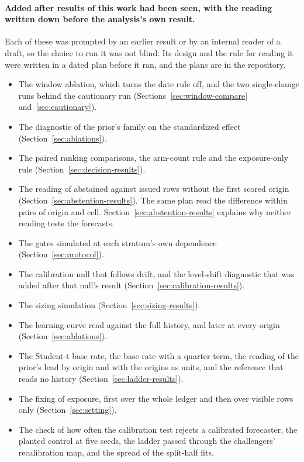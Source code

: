 \paragraph{Added after results of this work had been seen, with the reading written down before the analysis's own result.}
Each of these was prompted by an earlier result or by an internal reader of a draft, so the choice to run it was not blind. Its design and the rule for reading it were written in a dated plan before it ran, and the plans are in the repository.
\begin{itemize}
\item The window ablation, which turns the date rule off, and the two single-change runs behind the cautionary run (Sections~\ref{sec:window-compare} and~\ref{sec:cautionary}).
\item The diagnostic of the prior's family on the standardized effect (Section~\ref{sec:ablations}).
\item The paired ranking comparisons, the arm-count rule and the exposure-only rule (Section~\ref{sec:decision-results}).
\item The reading of abstained against issued rows without the first scored origin (Section~\ref{sec:abstention-results}). The same plan read the difference within pairs of origin and cell. Section~\ref{sec:abstention-results} explains why neither reading tests the forecasts.
\item The gates simulated at each stratum's own dependence (Section~\ref{sec:protocol}).
\item The calibration null that follows drift, and the level-shift diagnostic that was added after that null's result (Section~\ref{sec:calibration-results}).
\item The sizing simulation (Section~\ref{sec:sizing-results}).
\item The learning curve read against the full history, and later at every origin (Section~\ref{sec:ablations}).
\item The Student-t base rate, the base rate with a quarter term, the reading of the prior's lead by origin and with the origins as units, and the reference that reads no history (Section~\ref{sec:ladder-results}).
\item The fixing of exposure, first over the whole ledger and then over visible rows only (Section~\ref{sec:setting}).
\item The check of how often the calibration test rejects a calibrated forecaster, the planted control at five seeds, the ladder passed through the challengers' recalibration map, and the spread of the split-half fits.

\end{itemize}
